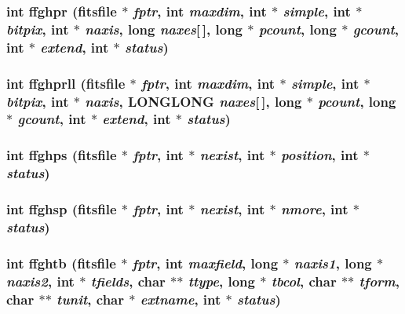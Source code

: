 \subsubsection{\setlength{\rightskip}{0pt plus 5cm}int ffghpr (\bf{fitsfile} $\ast$ {\em fptr}, int {\em maxdim}, int $\ast$ {\em simple}, int $\ast$ {\em bitpix}, int $\ast$ {\em naxis}, long {\em naxes}[$\,$], long $\ast$ {\em pcount}, long $\ast$ {\em gcount}, int $\ast$ {\em extend}, int $\ast$ {\em status})}\label{fitsio_8h_5eb7c7db8772313ff2612637ef1a1bf3}


\subsubsection{\setlength{\rightskip}{0pt plus 5cm}int ffghprll (\bf{fitsfile} $\ast$ {\em fptr}, int {\em maxdim}, int $\ast$ {\em simple}, int $\ast$ {\em bitpix}, int $\ast$ {\em naxis}, \bf{LONGLONG} {\em naxes}[$\,$], long $\ast$ {\em pcount}, long $\ast$ {\em gcount}, int $\ast$ {\em extend}, int $\ast$ {\em status})}\label{fitsio_8h_0d54065b1609c1b7edcbe08454996773}


\subsubsection{\setlength{\rightskip}{0pt plus 5cm}int ffghps (\bf{fitsfile} $\ast$ {\em fptr}, int $\ast$ {\em nexist}, int $\ast$ {\em position}, int $\ast$ {\em status})}\label{fitsio_8h_5bc2324399a2cc4c0cf179c6af73c253}


\subsubsection{\setlength{\rightskip}{0pt plus 5cm}int ffghsp (\bf{fitsfile} $\ast$ {\em fptr}, int $\ast$ {\em nexist}, int $\ast$ {\em nmore}, int $\ast$ {\em status})}\label{fitsio_8h_72d53ce1ae759524a27f68fc55dbc9ab}


\subsubsection{\setlength{\rightskip}{0pt plus 5cm}int ffghtb (\bf{fitsfile} $\ast$ {\em fptr}, int {\em maxfield}, long $\ast$ {\em naxis1}, long $\ast$ {\em naxis2}, int $\ast$ {\em tfields}, char $\ast$$\ast$ {\em ttype}, long $\ast$ {\em tbcol}, char $\ast$$\ast$ {\em tform}, char $\ast$$\ast$ {\em tunit}, char $\ast$ {\em extname}, int $\ast$ {\em status})}\label{fitsio_8h_31a49b3fe1b2a1e589794d420e2082fb}



